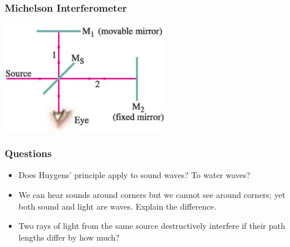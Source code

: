 \documentclass[]{beamer}
\begin{document}
\begin{frame}

\frametitle{Michelson Interferometer}



    \begin{center}
  \includegraphics[height=1.9in]{images5/Michelson2.jpg}
\end{center}



  \end{frame}











\begin{frame}

\frametitle{Questions}


\begin{itemize}
\item Does Huygens’ principle apply to sound waves? To water
waves?
\pause

\item We can hear sounds around corners but we cannot see
around corners; yet both sound and light are waves. Explain
the difference.
\pause

\item  Two rays of light from the same source destructively interfere
if their path lengths differ by how much?







\end{itemize}


  \end{frame}
\end{document}
